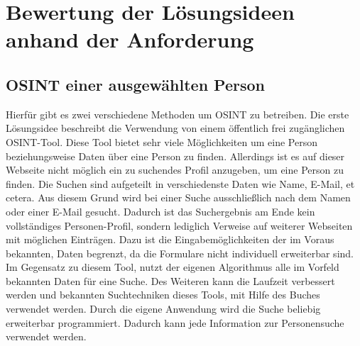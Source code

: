 

\chapter{Bewertung der Lösungsideen anhand der Anforderung}  %
\label{cha:BewertungLösungsideenAnhandAnforderung} %

\section{OSINT einer ausgewählten Person}
Hierfür gibt es zwei verschiedene Methoden um OSINT zu betreiben. Die erste Lösungsidee beschreibt die Verwendung von einem öffentlich frei zugänglichen OSINT-Tool. Diese Tool bietet sehr viele Möglichkeiten um eine Person beziehungsweise Daten über eine Person zu finden. Allerdings ist es auf dieser Webseite nicht möglich ein zu suchendes Profil anzugeben, um eine Person zu finden. Die Suchen sind aufgeteilt in verschiedenste Daten wie Name, E-Mail, et cetera. Aus diesem Grund wird bei einer Suche ausschließlich nach dem Namen oder einer E-Mail gesucht. Dadurch ist das Suchergebnis am Ende kein vollständiges Personen-Profil, sondern lediglich Verweise auf weiterer Webseiten mit möglichen Einträgen. Dazu ist die Eingabemöglichkeiten der im Voraus bekannten, Daten begrenzt, da die Formulare nicht individuell erweiterbar sind.\\
Im Gegensatz zu diesem Tool, nutzt der eigenen Algorithmus alle im Vorfeld bekannten Daten für eine Suche. Des Weiteren kann die Laufzeit verbessert werden und bekannten Suchtechniken dieses Tools, mit Hilfe des Buches \cite{Bazzell} verwendet werden. Durch die eigene Anwendung wird die Suche beliebig erweiterbar programmiert. Dadurch kann jede Information zur Personensuche verwendet werden.

